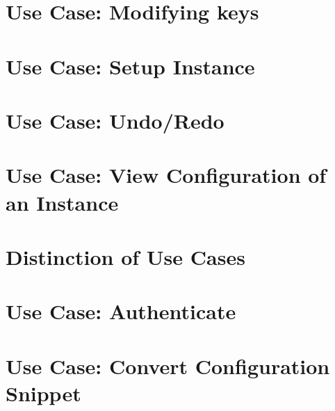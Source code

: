 \documentclass[twoside]{book}
\newcommand{\+}{\discretionary{\mbox{\scriptsize$\hookleftarrow$}}{}{}}
\begin{document}
\chapter{Use Case\+: Modifying keys}
\label{doc_usecases_elektra_web_UC_modifying_keys_md}

\chapter{Use Case\+: Setup Instance}
\label{doc_usecases_elektra_web_UC_setup_instance_md}

\chapter{Use Case\+: Undo/\+Redo}
\label{doc_usecases_elektra_web_UC_undo_redo_md}

\chapter{Use Case\+: View Configuration of an Instance}
\label{doc_usecases_elektra_web_UC_view_config_md}

\chapter{Distinction of Use Cases}
\label{doc_usecases_snippet_sharing_distinction_use_cases_md}

\chapter{Use Case\+: Authenticate}
\label{doc_usecases_snippet_sharing_UC_authenticate_md}

\chapter{Use Case\+: Convert Configuration Snippet}
\label{doc_usecases_snippet_sharing_UC_convert_snippet_md}

\end{document}
